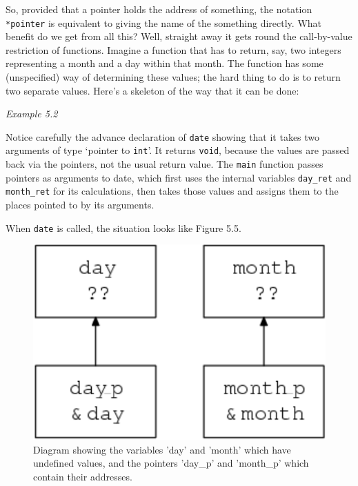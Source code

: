    So, provided that a pointer holds the address of something, the
    notation \texttt{*pointer} is equivalent to giving the name of the
    something directly. What benefit do we get from all this? Well, straight
    away it gets round the call-by-value restriction of functions. Imagine
    a function that has to return, say, two integers representing a month
    and a day within that month. The function has some (unspecified) way of
    determining these values; the hard thing to do is to return two separate
    values. Here's a skeleton of the way that it can be done:


   \begin{center}\textit{Example 5.2}\end{center}


   Notice carefully the advance declaration of \texttt{date} showing
    that it takes two arguments of type `pointer to \texttt{int}'.
    It returns \texttt{void}, because the values are passed back via the
    pointers, not the usual return value. The \texttt{main} function
    passes pointers as arguments to date, which first uses the internal
    variables \texttt{day\_ret} and \texttt{month\_ret} for its
    calculations, then takes those values and assigns them to the places
    pointed to by its arguments.


   When \texttt{date} is called, the situation looks like Figure 5.5.


   \begin{figure}\centering\includegraphics[type=pdf,read=.pdf,ext=.pdf,scale=1.0]{figure/5.5}\caption{Diagram showing the variables 'day' and 'month' which have undefined            values, and the pointers 'day\_p' and 'month\_p' which contain their            addresses.}\end{figure}

